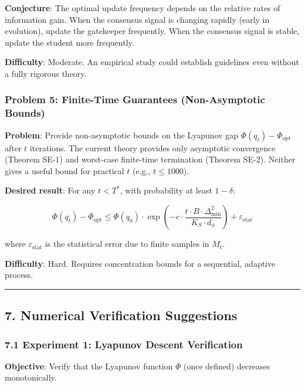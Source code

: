 \documentclass[
  12pt,
]{ctexart}
\begin{document}
\textbf{Conjecture}: The optimal update frequency depends on the
relative rates of information gain. When the consensus signal is
changing rapidly (early in evolution), update the gatekeeper frequently.
When the consensus signal is stable, update the student more frequently.

\textbf{Difficulty}: Moderate. An empirical study could establish
guidelines even without a fully rigorous theory.

\subsubsection{Problem 5: Finite-Time Guarantees (Non-Asymptotic
Bounds)}\label{problem-5-finite-time-guarantees-non-asymptotic-bounds}

\textbf{Problem}: Provide non-asymptotic bounds on the Lyapunov gap
\(\Phi(q_t) - \Phi_{\text{opt}}\) after \(t\) iterations. The current
theory provides only asymptotic convergence (Theorem SE-1) and
worst-case finite-time termination (Theorem SE-2). Neither gives a
useful bound for practical \(t\) (e.g., \(t \leq 1000\)).

\textbf{Desired result}: For any \(t < T^*\), with probability at least
\(1-\delta\):

\[\Phi(q_t) - \Phi_{\text{opt}} \leq \Phi(q_0) \cdot \exp\left(-c \cdot \frac{t \cdot B \cdot \Delta_{\min}^2}{K_S \cdot d_\phi}\right) + \varepsilon_{\text{stat}}\]

where \(\varepsilon_{\text{stat}}\) is the statistical error due to
finite samples in \(M_t\).

\textbf{Difficulty}: Hard. Requires concentration bounds for a
sequential, adaptive process.

\begin{center}\rule{0.5\linewidth}{0.5pt}\end{center}

\subsection{7. Numerical Verification
Suggestions}\label{numerical-verification-suggestions}

\subsubsection{7.1 Experiment 1: Lyapunov Descent
Verification}\label{experiment-1-lyapunov-descent-verification}

\textbf{Objective}: Verify that the Lyapunov function \(\Phi\) (once
defined) decreases monotonically.
\end{document}
